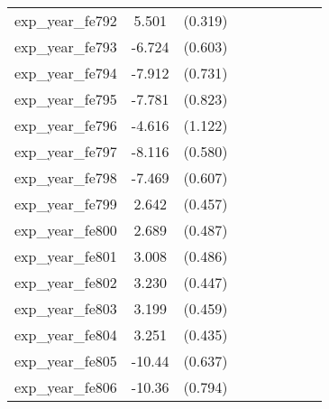 {\begin{tabular}{l*{4}{cc}}
exp\_year\_fe792&    5.501\sym{***}&  (0.319)&                  &         &                  &         &                  &         \\
exp\_year\_fe793&   -6.724\sym{***}&  (0.603)&                  &         &                  &         &                  &         \\
exp\_year\_fe794&   -7.912\sym{***}&  (0.731)&                  &         &                  &         &                  &         \\
exp\_year\_fe795&   -7.781\sym{***}&  (0.823)&                  &         &                  &         &                  &         \\
exp\_year\_fe796&   -4.616\sym{***}&  (1.122)&                  &         &                  &         &                  &         \\
exp\_year\_fe797&   -8.116\sym{***}&  (0.580)&                  &         &                  &         &                  &         \\
exp\_year\_fe798&   -7.469\sym{***}&  (0.607)&                  &         &                  &         &                  &         \\
exp\_year\_fe799&    2.642\sym{***}&  (0.457)&                  &         &                  &         &                  &         \\
exp\_year\_fe800&    2.689\sym{***}&  (0.487)&                  &         &                  &         &                  &         \\
exp\_year\_fe801&    3.008\sym{***}&  (0.486)&                  &         &                  &         &                  &         \\
exp\_year\_fe802&    3.230\sym{***}&  (0.447)&                  &         &                  &         &                  &         \\
exp\_year\_fe803&    3.199\sym{***}&  (0.459)&                  &         &                  &         &                  &         \\
exp\_year\_fe804&    3.251\sym{***}&  (0.435)&                  &         &                  &         &                  &         \\
exp\_year\_fe805&   -10.44\sym{***}&  (0.637)&                  &         &                  &         &                  &         \\
exp\_year\_fe806&   -10.36\sym{***}&  (0.794)&                  &         &                  &         &                  &         \\

\end{tabular}}
